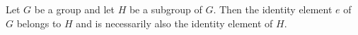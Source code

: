 Let $G$ be a group and let $H$ be a subgroup of $G$. Then the identity element $e$ of $G$ belongs to $H$ and is necessarily also the identity element of $H$.
